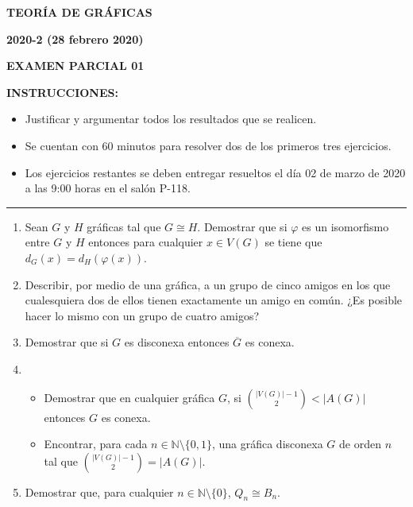 \documentclass[10pt]{report}
\begin{document}
\begin{center}
\textbf{\LARGE {TEORÍA DE GRÁFICAS}}
\end{center}

\begin{center}
\textbf{{\large 2020-2 (28 febrero 2020)}}
\end{center}

\begin{center}
\textbf{{\large EXAMEN PARCIAL 01}}
\end{center}

{\bf INSTRUCCIONES:} 
\begin{itemize}
\item Justificar y argumentar todos los resultados que se realicen.
\item Se cuentan con 60 minutos para resolver dos de los primeros tres ejercicios.
\item Los ejercicios restantes se deben entregar resueltos el día 02 de marzo de 2020 a las 9:00 horas en el salón P-118.
\end{itemize}

\begin{center}
\rule[0mm]{20cm}{0.2mm}
\end{center}

\begin{enumerate}

\item Sean $G$ y $H$ gráficas tal que $G \cong H$. Demostrar que si $\varphi$ es un isomorfismo entre $G$ y $H$ entonces para cualquier $x \in V(G)$ se tiene que $d_G(x) = d_H(\varphi(x))$.

\item Describir, por medio de una gráfica, a un grupo de cinco amigos en los que cualesquiera dos de ellos tienen exactamente un amigo en común. ¿Es posible hacer lo mismo con un grupo de cuatro amigos?

\item Demostrar que si $G$ es disconexa entonces $\overline{G}$ es conexa. 

\item
\begin{itemize}
\item Demostrar que en cualquier gráfica $G$, si ${|V(G)| -1 \choose 2} < |A(G)|$ entonces $G$ es conexa.
\item Encontrar, para cada $n \in \mathbb{N} \setminus \{0,1\}$, una gráfica disconexa $G$ de orden $n$ tal que ${|V(G)| -1 \choose 2} = |A(G)|$.
\end{itemize}

\item Demostrar que, para cualquier $n \in \mathbb{N} \setminus \{0\}$, $Q_n \cong B_n$.

\end{enumerate}
\end{document}
